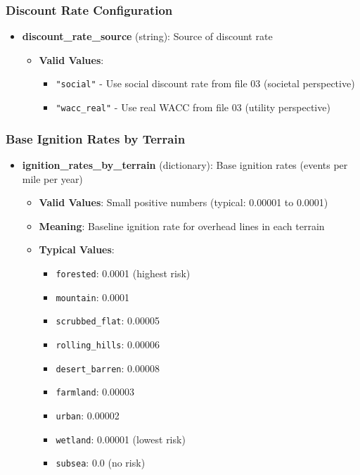 \documentclass[ctcc_full_documentation.tex]{subfiles}
\begin{document}
\subsubsection{Discount Rate Configuration}

\begin{itemize}
    \item \textbf{discount\_rate\_source} (string): Source of discount rate
    \begin{itemize}
        \item \textbf{Valid Values}: 
        \begin{itemize}
            \item \texttt{"social"} - Use social discount rate from file 03 (societal perspective)
            \item \texttt{"wacc\_real"} - Use real WACC from file 03 (utility perspective)
        \end{itemize}
    \end{itemize}
\end{itemize}

\subsubsection{Base Ignition Rates by Terrain}

\begin{itemize}
    \item \textbf{ignition\_rates\_by\_terrain} (dictionary): Base ignition rates (events per mile per year)
    \begin{itemize}
        \item \textbf{Valid Values}: Small positive numbers (typical: 0.00001 to 0.0001)
        \item \textbf{Meaning}: Baseline ignition rate for overhead lines in each terrain
        \item \textbf{Typical Values}:
        \begin{itemize}
            \item \texttt{forested}: 0.0001 (highest risk)
            \item \texttt{mountain}: 0.0001
            \item \texttt{scrubbed\_flat}: 0.00005
            \item \texttt{rolling\_hills}: 0.00006
            \item \texttt{desert\_barren}: 0.00008
            \item \texttt{farmland}: 0.00003
            \item \texttt{urban}: 0.00002
            \item \texttt{wetland}: 0.00001 (lowest risk)
            \item \texttt{subsea}: 0.0 (no risk)
        \end{itemize}
    \end{itemize}
\end{itemize}
\end{document}
